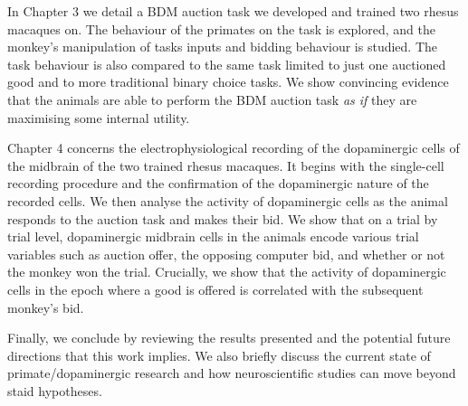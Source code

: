 \begin{summary}
In Chapter 3 we detail a BDM auction task we developed and trained two rhesus macaques on. The behaviour of the primates on the task is explored, and the monkey's manipulation of tasks inputs and bidding behaviour is studied. The task behaviour is also compared to the same task limited to just one auctioned good and to more traditional binary choice tasks. We show convincing evidence that the animals are able to perform the BDM auction task \textit{as if} they are maximising some internal utility.

Chapter 4 concerns the electrophysiological recording of the dopaminergic cells of the midbrain of the two trained rhesus macaques. It begins with the single-cell recording procedure and the confirmation of the dopaminergic nature of the recorded cells. We then analyse the activity of dopaminergic cells as the animal responds to the auction task and makes their bid. We show that on a trial by trial level, dopaminergic midbrain cells in the animals encode various trial variables such as auction offer, the opposing computer bid, and whether or not the monkey won the trial. Crucially, we show that the activity of dopaminergic cells in the epoch where a good is offered is correlated with the subsequent monkey's bid.

Finally, we conclude by reviewing the results presented and the potential future directions that this work implies. We also briefly discuss the current state of primate/dopaminergic research and how neuroscientific studies can move beyond staid hypotheses.
\end{summary}
